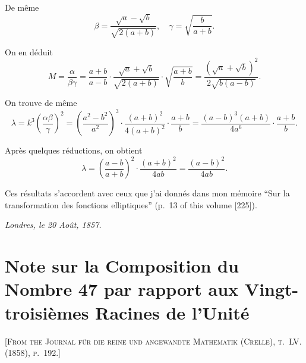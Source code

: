 \documentclass[11pt,a4paper]{book}
\begin{document}
De même
\[
\beta = \frac{\sqrt{a}-\sqrt{b}}{\sqrt{2(a+b)}}, \quad
\gamma = \sqrt{\frac{b}{a+b}}.
\]

On en déduit
\[
M = \frac{\alpha}{\beta\gamma} = \frac{a+b}{a-b} \cdot \frac{\sqrt{a}+\sqrt{b}}{\sqrt{2(a+b)}} \cdot \sqrt{\frac{a+b}{b}}
= \frac{(\sqrt{a}+\sqrt{b})^2}{2\sqrt{b(a-b)}}.
\]

\setcounter{page}{70}

On trouve de même
\[
\lambda = k^3 \left(\frac{\alpha\beta}{\gamma}\right)^2
= \left(\frac{a^2-b^2}{a^2}\right)^{\!3} \cdot \frac{(a+b)^2}{4(a+b)^2} \cdot \frac{a+b}{b}
= \frac{(a-b)^3(a+b)}{4a^6} \cdot \frac{a+b}{b}.
\]

Après quelques réductions, on obtient
\[
\lambda = \left(\frac{a-b}{a+b}\right)^2 \cdot \frac{(a+b)^2}{4ab}
= \frac{(a-b)^2}{4ab}.
\]

Ces résultats s'accordent avec ceux que j'ai donnés dans mon mémoire ``Sur la transformation des fonctions elliptiques'' (p.~13 of this volume [225]).

\medskip
\noindent\textit{Londres, le 20 Août, 1857.}

\newpage



\section{Note sur la Composition du Nombre 47 par rapport aux Vingt-troisièmes Racines de l'Unité}

\textsc{[From the Journal für die reine und angewandte Mathematik (Crelle), t.~LV. (1858), p.~192.]}
\label{paper:236}

\setcounter{page}{71}
\end{document}
